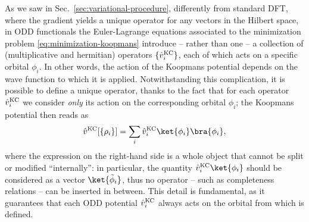 As we saw in Sec.~\ref{sec:variational-procedure}, differently from standard DFT, where the gradient yields a unique operator for any vectors in the Hilbert space, in ODD functionals the Euler-Lagrange equations associated to the minimization problem \eqref{eq:minimization-koopmans} introduce -- rather than one -- a collection of (multiplicative and hermitian) operators $\{ \hat{v}_i^{\rm KC} \}$, each of which acts on a specific orbital $\phi_i$. In other words, the action of the Koopmans potential depends on the wave function to which it is applied. Notwithstanding this complication, it is possible to define a unique operator, thanks to the fact that for each operator $\hat{v}_i^{\rm KC}$ we consider \emph{only} its action on the corresponding orbital $\phi_i$; the Koopmans potential then reads as
%
\begin{equation}
    \hat{v}^{\rm KC}[\{ \rho_i \}] = \sum_i \hat{v}^{\rm KC}_i \ket{\phi_i} \bra{\phi_i} ,
    \label{eq:koopmans-potential}
\end{equation}
%
where the expression on the right-hand side is a whole object that cannot be split or modified ``internally'': in particular, the quantity $\hat{v}^{\rm KC}_i \ket{\phi_i}$ should be considered as a vector $\ket{\Tilde{\phi}_i}$, thus no operator -- such as completeness relations -- can be inserted in between. This detail is fundamental, as it guarantees that each ODD potential $\hat{v}^{\rm KC}_i$ always acts on the orbital from which is defined.

